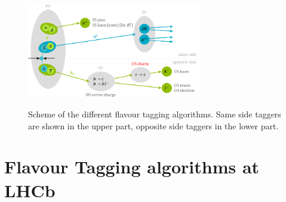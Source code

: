 \documentclass{PoS}
\begin{document}
\begin{figure}[htbp]
	\begin{center}
		\includegraphics[width=0.68\textwidth, angle=0]{figs/FlavourTaggerScheme.pdf}
		\small{\caption{Scheme of the different flavour tagging algorithms. Same side taggers are shown in the upper part, opposite side taggers in the lower part.}}
		\label{fig:flavtagscheme}
	\end{center}
\end{figure}

\section{Flavour Tagging algorithms at LHCb}\label{sec:2}
\end{document}
